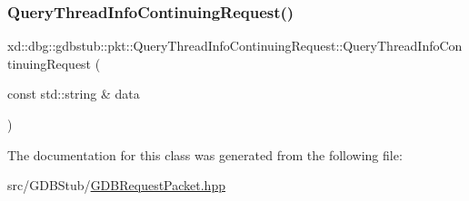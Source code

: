 \subsubsection{\texorpdfstring{Query\+Thread\+Info\+Continuing\+Request()}{QueryThreadInfoContinuingRequest()}}
{\footnotesize\ttfamily xd\+::dbg\+::gdbstub\+::pkt\+::\+Query\+Thread\+Info\+Continuing\+Request\+::\+Query\+Thread\+Info\+Continuing\+Request (\begin{DoxyParamCaption}\item[{const std\+::string \&}]{data }\end{DoxyParamCaption})\hspace{0.3cm}{\ttfamily [inline]}}



The documentation for this class was generated from the following file\+:\begin{DoxyCompactItemize}
\item 
src/\+G\+D\+B\+Stub/\mbox{\hyperlink{_g_d_b_request_packet_8hpp}{G\+D\+B\+Request\+Packet.\+hpp}}\end{DoxyCompactItemize}
